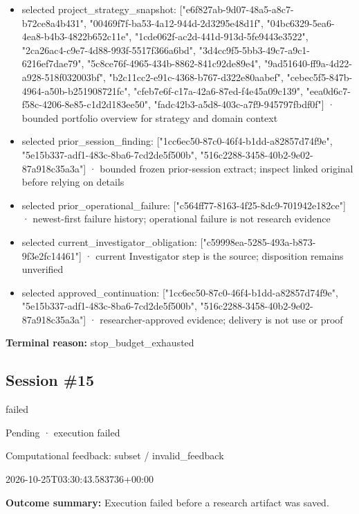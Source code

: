 \documentclass[11pt]{article}
\begin{document}
\begin{itemize}
\item selected project\_strategy\_snapshot: ["e6f827ab-9d07-48a5-a8c7-b72ce8a4b431", "00469f7f-ba53-4a12-944d-2d3295e48d1f", "04bc6329-5ea6-4ea8-b4b3-4822b652c11e", "1cde062f-ac2d-441d-913d-5fe9443e3522", "2ca26ac4-c9e7-4d88-993f-5517f366a6bd", "3d4cc9f5-5bb3-49c7-a9c1-6216ef7dae79", "5c8ce76f-4965-434b-8862-841c92de89e4", "9ad51640-ff9a-4d22-a928-518f032003bf", "b2c11cc2-e91c-4368-b767-d322e80aabef", "cebec5f5-847b-4964-a50b-b251908721fc", "cfeb7e6f-c17a-42a6-87ed-f4e45a09c139", "eea0d6c7-f58c-4206-8e85-c1d2d183ee50", "fadc42b3-a5d8-403c-a7f9-945797fbdf0f"] · bounded portfolio overview for strategy and domain context
\item selected prior\_session\_finding: ["1cc6ec50-87c0-46f4-b1dd-a82857d74f9e", "5e15b337-adf1-483c-8ba6-7cd2de5f500b", "516c2288-3458-40b2-9e02-87a918c35a3a"] · bounded frozen prior-session extract; inspect linked original before relying on details
\item selected prior\_operational\_failure: ["c564ff77-8163-4f25-8dc9-701942e182ce"] · newest-first failure history; operational failure is not research evidence
\item selected current\_investigator\_obligation: ["c59998ea-5285-493a-b873-9f3e2fc14461"] · current Investigator step is the source; disposition remains unverified
\item selected approved\_continuation: ["1cc6ec50-87c0-46f4-b1dd-a82857d74f9e", "5e15b337-adf1-483c-8ba6-7cd2de5f500b", "516c2288-3458-40b2-9e02-87a918c35a3a"] · researcher-approved evidence; delivery is not use or proof
\end{itemize}
\textbf{Terminal reason:} stop\_budget\_exhausted\par
\subsection{Session \#15}
\begin{description}[style=nextline,font=\normalfont\bfseries,leftmargin=0pt,labelsep=0pt]
\item[Execution status] failed
\item[Outcome] Pending · execution failed
\item[Strategy] Computational feedback: subset / invalid\_feedback
\item[Started] 2026-10-25T03:30:43.583736+00:00
\end{description}
\textbf{Outcome summary:} Execution failed before a research artifact was saved.\par
\end{document}

